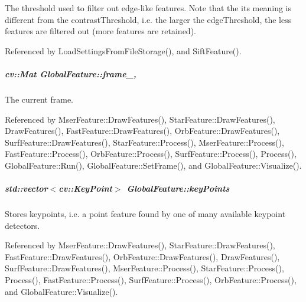 The threshold used to filter out edge-\/like features. Note that the its meaning is different from the contrast\-Threshold, i.\-e. the larger the edge\-Threshold, the less features are filtered out (more features are retained). 



Referenced by Load\-Settings\-From\-File\-Storage(), and Sift\-Feature().

\hypertarget{group___feature_extractor_aae4295da2c3999edcb99b46d70ee7166}{
\subparagraph[{frame\-\_\-}]{\setlength{\rightskip}{0pt plus 5cm}cv\-::\-Mat Global\-Feature\-::frame\-\_\-\hspace{0.3cm}{\ttfamily [protected]}, {\ttfamily [inherited]}}}\label{group___feature_extractor_aae4295da2c3999edcb99b46d70ee7166}


The current frame. 



Referenced by Mser\-Feature\-::\-Draw\-Features(), Star\-Feature\-::\-Draw\-Features(), Draw\-Features(), Fast\-Feature\-::\-Draw\-Features(), Orb\-Feature\-::\-Draw\-Features(), Surf\-Feature\-::\-Draw\-Features(), Star\-Feature\-::\-Process(), Mser\-Feature\-::\-Process(), Fast\-Feature\-::\-Process(), Orb\-Feature\-::\-Process(), Surf\-Feature\-::\-Process(), Process(), Global\-Feature\-::\-Run(), Global\-Feature\-::\-Set\-Frame(), and Global\-Feature\-::\-Visualize().

\hypertarget{group___feature_extractor_a72cc606c0090a64718a7e92bca7520b9}{
\subparagraph[{key\-Points}]{\setlength{\rightskip}{0pt plus 5cm}std\-::vector$<$cv\-::\-Key\-Point$>$ Global\-Feature\-::key\-Points\hspace{0.3cm}{\ttfamily [inherited]}}}\label{group___feature_extractor_a72cc606c0090a64718a7e92bca7520b9}


Stores keypoints, i.\-e. a point feature found by one of many available keypoint detectors. 



Referenced by Mser\-Feature\-::\-Draw\-Features(), Star\-Feature\-::\-Draw\-Features(), Fast\-Feature\-::\-Draw\-Features(), Orb\-Feature\-::\-Draw\-Features(), Draw\-Features(), Surf\-Feature\-::\-Draw\-Features(), Mser\-Feature\-::\-Process(), Star\-Feature\-::\-Process(), Process(), Fast\-Feature\-::\-Process(), Surf\-Feature\-::\-Process(), Orb\-Feature\-::\-Process(), and Global\-Feature\-::\-Visualize().

